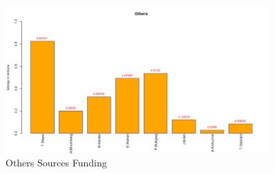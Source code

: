 \begin{figure}[H]
    \centering
    \includegraphics[width=0.9\textwidth]{figures/Others.png}
    \caption{Others Sources Funding}
    \label{Others}
\end{figure}
